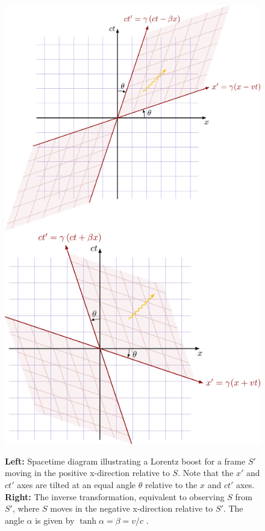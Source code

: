 \documentclass[a4paper]{article}
\begin{document}
\begin{figure}[ht]
    \centering
    \includegraphics[width=0.49\linewidth]{img/lorentz boost.png}
    \includegraphics[width=0.49\linewidth]{img/inverse boost.png}
    \caption{\textbf{Left:} Spacetime diagram illustrating a Lorentz boost for a frame $S'$ moving in the positive x-direction relative to $S$. Note that the $x'$ and $ct'$ axes are tilted at an equal angle $\theta$ relative to the $x$ and $ct'$ axes. \textbf{Right:} The inverse transformation, equivalent to observing $S$ from $S'$, where $S$ moves in the negative x-direction relative to $S'$. The angle $\alpha$ is given by $\tanh \alpha = \beta = v/c$ \cite{tikz}.}
    \label{fig:boost}
\end{figure}
\end{document}
